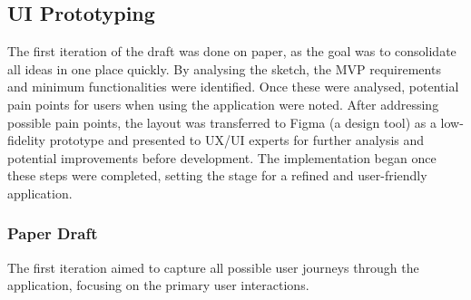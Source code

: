 \subsection{UI Prototyping}
The first iteration of the draft was done on paper, as the goal was to consolidate all ideas in one place quickly. By analysing the sketch, the MVP requirements and minimum functionalities were identified. Once these were analysed, potential pain points for users when using the application were noted. After addressing possible pain points, the layout was transferred to Figma (a design tool) as a low-fidelity prototype and presented to UX/UI experts for further analysis and potential improvements before development. The implementation began once these steps were completed, setting the stage for a refined and user-friendly application.

\subsubsection{Paper Draft}
The first iteration aimed to capture all possible user journeys through the application, focusing on the primary user interactions.

